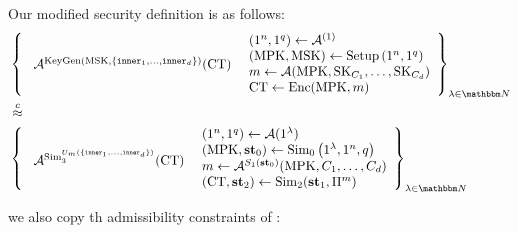 Our modified security definition is as follows:
\begin{equation}
\label{eq:FEsec}
\begin{aligned}
	&\left\{
		\begin{array}{l}
		\vcenter{\hbox{
			$\advers^{\text{KeyGen}(\MSK, \{\inner_1, \dots, \inner_d\})}(\mathbf{\FECT})$
			}}
		\end{array}
		\begin{array}{l}
		\left(1^n, 1^q\right) \leftarrow \advers^{(1)} \\
		\left(\MPK, \MSK\right) \leftarrow \text{Setup}\left(1^n, 1^q\right) \\
		m \leftarrow \advers(\MPK, \SK_{C_1}, \dots, \SK_{C_d}) \\
		\FECT \leftarrow \text{Enc}(\MPK, m)
		\end{array}
	\right\}_{\lambda \in \N}\\
&\compInd \\
	&\left\{
		\begin{array}{l}
		\vcenter{\hbox{
			$\advers^{\Sim_3^{U_m(\{\inner_1, \dots, \inner_d\})}}(\FECT)$
		}}
		\end{array}
		\begin{array}{l}
		\left(1^n, 1^q\right) \leftarrow \advers{(1^\lambda)} \\
		\left(\MPK, \mathbf{st}_0\right) \leftarrow \Sim_0\left(1^\lambda, 1^n, q\right) \\
		m \leftarrow \advers^{S_1(\mathbf{st}_0)}(\MPK, C_1, \dots, C_d) \\
		\left(\FECT, \mathbf{st}_2\right) \leftarrow \Sim_2(\mathbf{st}_1, \Pi^m)
		\end{array}
	\right\}_{\lambda \in \N}
\end{aligned}
\end{equation}

we also copy th admissibility constraints of \cite{garg2022dynamic}:


